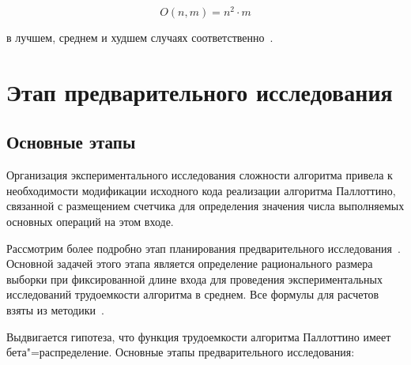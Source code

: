 \documentclass[a4paper,fontsize=14pt]{article}
\begin{document}
\begin{equation}\label{eq:pallottino_worst}
O(n, m) = n^2 \cdot m
\end{equation}

в лучшем, среднем и худшем случаях соответственно~\cite{pallottino}.

\section{Этап предварительного исследования} \label{sec:analysis_part_1}

\subsection{Основные этапы} \label{subsec:analysis_part_1_intro}

Организация экспериментального исследования сложности алгоритма привела к необходимости модификации исходного кода реализации алгоритма Паллоттино, связанной с размещением счетчика для определения значения числа выполняемых основных операций на этом входе.

Рассмотрим более подробно этап планирования предварительного исследования~\cite{petrushyn_ulyanov_planning}. Основной задачей этого этапа является определение рационального размера выборки при фиксированной длине входа для проведения экспериментальных исследований трудоемкости алгоритма в среднем. Все формулы для расчетов взяты из методики~\cite{petrushyn_ulyanov_planning}.

Выдвигается гипотеза, что функция трудоемкости алгоритма Паллоттино имеет бета"=распределение. Основные этапы предварительного исследования:
\end{document}

